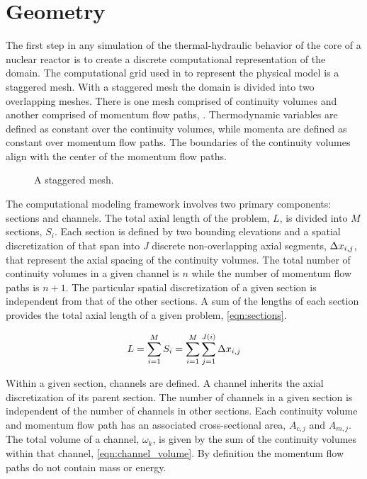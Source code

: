 \section{Geometry}
\label{sect:geometry}
The first step in any simulation of the thermal-hydraulic behavior of the core of a nuclear reactor is to create a discrete computational representation of the domain.
The computational grid used in \cobra{} to represent the physical model is a staggered mesh.
With a staggered mesh the domain is divided into two overlapping meshes.
There is one mesh comprised of continuity volumes and another comprised of momentum flow paths, .
Thermodynamic variables are defined as constant over the continuity volumes, while momenta are defined as constant over momentum flow paths.
The boundaries of the continuity volumes align with the center of the momentum flow paths.

\begin{figure}[ht!]
\centering

\caption{A staggered mesh.}
\label{fig:staggered_mesh}
\end{figure}

The computational modeling framework involves two primary components: sections and channels.
The total axial length of the problem, $L$, is divided into $M$ sections, $S_i$.
Each section is defined by two bounding elevations and a spatial discretization of that span into $J$ discrete non-overlapping axial segments, $\dx{}_{i,j}$, that represent the axial spacing of the continuity volumes.
The total number of continuity volumes in a given channel is $n$ while the number of momentum flow paths is $n+1$.
The particular spatial discretization of a given section is independent from that of the other sections.
A sum of the lengths of each section provides the total axial length of a given problem, \eqref{eqn:sections}.

\begin{equation}
\label{eqn:sections}
L = \sum_{i=1}^{M} S_i = \sum_{i=1}^{M}\sum_{j=1}^{J(i)} \dx{}_{i,j}
\end{equation}

Within a given section, channels are defined.
A channel inherits the axial discretization of its parent section.
The number of channels in a given section is independent of the number of channels in other sections.
Each continuity volume and momentum flow path has an associated cross-sectional area, $A_{c, j}$ and $A_{m,j}$. 
The total volume of a channel, $\omega_k$, is given by the sum of the continuity volumes within that channel, \eqref{eqn:channel_volume}.
By definition the momentum flow paths do not contain mass or energy.

